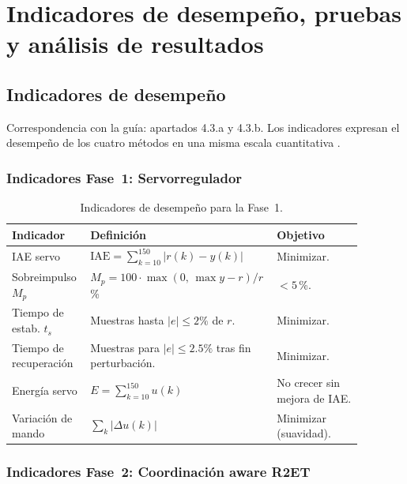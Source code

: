 \chapter[Indicadores, pruebas y resultados]{Indicadores de desempeño, pruebas y análisis de resultados}
\label{ch:pruebas}

\section{Indicadores de desempeño}

Correspondencia con la guía: apartados 4.3.a y 4.3.b. Los indicadores expresan el desempeño de los cuatro métodos en una misma escala cuantitativa \cite{martinRodellarControlAdaptativo}.

\subsection*{Indicadores Fase~1: Servorregulador}

\begin{table}[H]
\centering
\caption{Indicadores de desempeño para la Fase~1.}
\label{tab:indicadores_servo}
\begin{tabular}{@{}P{0.22\linewidth}P{0.42\linewidth}P{0.24\linewidth}@{}}
\toprule
Indicador & Definición & Objetivo \\ \midrule
IAE servo & $\text{IAE} = \sum_{k=10}^{150}|r(k)-y(k)|$ & Minimizar.\\
Sobreimpulso $M_p$ & $M_p = 100\cdot\max(0,\,\max y - r)/r$\,\% & $< 5$\,\%.\\
Tiempo de estab. $t_s$ & Muestras hasta $|e| \leq 2\%$ de $r$. & Minimizar.\\
Tiempo de recuperación & Muestras para $|e| \leq 2.5\%$ tras fin perturbación. & Minimizar.\\
Energía servo & $E = \sum_{k=10}^{150}u(k)$ & No crecer sin mejora de IAE.\\
Variación de mando & $\sum_{k}|\Delta u(k)|$ & Minimizar (suavidad).\\
\bottomrule
\end{tabular}
\end{table}

\subsection*{Indicadores Fase~2: Coordinación aware R2ET}

